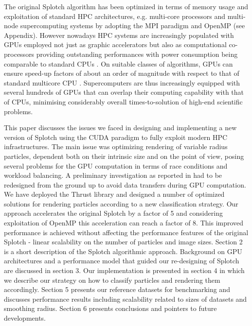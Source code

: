 \documentclass[11pt]{article}
\begin{document}

The original Splotch algorithm has been optimized in terms of memory usage and exploitation of standard HPC architectures, e.g. multi-core processors and multi-node supercomputing systems by adopting the MPI paradigm \cite{jin:high-performance} and OpenMP (see Appendix). However nowadays HPC systems are increasingly populated with GPUs employed not just as graphic accelerators but also as computational co-processors providing outstanding performances with power consumption being comparable to standard CPUs \cite{}. On suitable classes of algorithms, GPUs can ensure speed-up factors of about an order of magnitude with respect to that of standard multicore CPU \cite{}. Supercomputers are thus increasingly equipped with several hundreds of GPUs that can overlap their computing capability with that of CPUs, minimising considerably overall times-to-solution of high-end scientific problems.

This paper discusses the issues we faced in designing and implementing a new version of Splotch using the CUDA paradigm to fully exploit modern HPC infrastructures. The main issue was optimizing rendering of variable radius particles, dependent both on their intrinsic size and on the point of view, posing several problems for the GPU computation in terms of race conditions and workload balancing. A preliminary investigation as reported in \cite{jin:high-performance} had to be redesigned from the ground up to avoid data transfers during GPU computation. We have deployed the Thrust library \cite{thrusturl} and designed a number of optimized solutions for rendering particles according to a new classification strategy. Our approach accelerates the original Splotch by a factor of 5 and considering exploitation of OpenMP this acceleration can reach a factor of 8.  This improved performance is achieved without affecting the performance features of the original Splotch - linear scalability on the number of particles and image sizes. Section 2 is a short description of the Splotch algorithmic approach. Background on GPU architectures and a performance model that guided our re-designing of Splotch are discussed in section 3. Our implementation is presented in section 4 in which we describe our strategy on how to classify particles and rendering them accordingly. Section 5 presents our reference datasets for benchmarking and discusses performance results including scalability related to sizes of datasets and smoothing radius. Section 6 presents conclusions and pointers to future developments.
\end{document}
